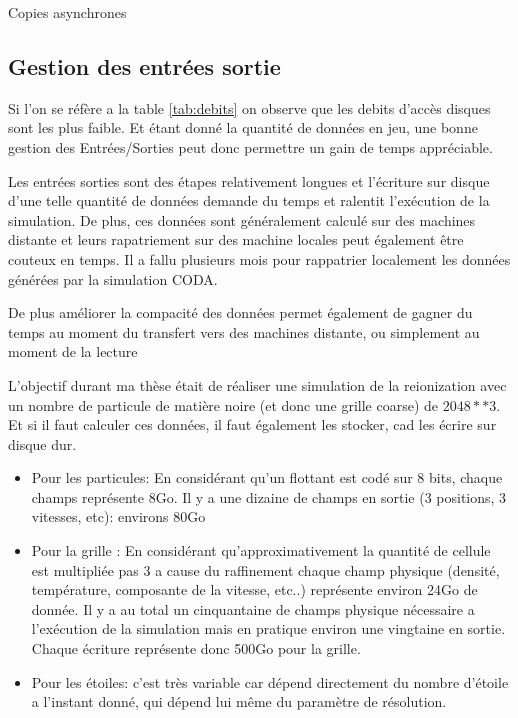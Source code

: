 Copies asynchrones




\subsection{Gestion des entrées sortie}

Si l'on se réfère a la table \ref{tab:debits} on observe que les debits d'accès disques sont les plus faible.
Et étant donné la quantité de données en jeu, une bonne gestion des Entrées/Sorties peut donc permettre un gain de temps appréciable.

Les entrées sorties sont des étapes relativement longues et l'écriture sur disque d'une telle quantité de données demande du temps et ralentit l'exécution de la simulation.
De plus, ces données sont généralement calculé sur des machines distante et leurs rapatriement sur des machine locales peut également être couteux en temps.
Il a fallu plusieurs mois pour rappatrier localement les données générées par la simulation CODA.

De plus améliorer la compacité des données permet également de gagner du temps au moment du transfert vers des machines distante, ou simplement au moment de la lecture



L'objectif durant ma thèse était de réaliser une simulation de la reionization avec un nombre de particule de matière noire (et donc une grille coarse) de $2048**3$.
Et si il faut calculer ces données, il faut également les stocker, cad les écrire sur disque dur.

\begin{itemize}
\item Pour les particules:
En considérant qu'un flottant est codé sur 8 bits, chaque champs représente 8Go.
Il y a une dizaine de champs en sortie (3 positions, 3 vitesses, etc): environs 80Go

\item Pour la grille :
En considérant qu'approximativement la quantité de cellule est multipliée pas 3 a cause du raffinement  chaque champ physique (densité, température, composante de la vitesse, etc..) représente environ 24Go de donnée.
Il y a au total un cinquantaine de champs physique nécessaire a l'exécution de la simulation mais en pratique environ une vingtaine en sortie.
Chaque écriture représente donc 500Go pour la grille.

\item Pour les étoiles:
c'est très variable car dépend directement du nombre d'étoile a l'instant donné, qui dépend lui même du paramètre de résolution.
\end{itemize}

